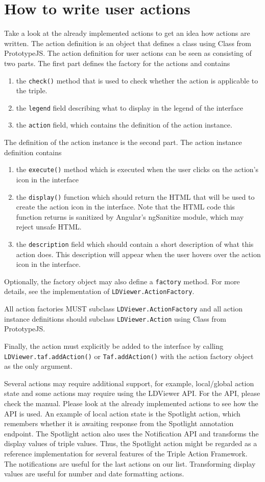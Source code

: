 \documentclass{article}
\begin{document}
\section{How to write user actions}
Take a look at the already implemented actions to get an idea how actions are written.
The action definition is an object that defines a class using Class from PrototypeJS.
The action definition for user actions can be seen as consisting of two parts. The first part defines the factory for the actions and contains 
\begin{enumerate}
\item the \texttt{check()} method that is used to check whether the action is applicable to the triple.
\item the \texttt{legend} field describing what to display in the legend of the interface
\item the \texttt{action} field, which contains the definition of the action instance.
\end{enumerate}
The definition of the action instance is the second part.
The action instance definition contains 
\begin{enumerate}
\item the \texttt{execute()} method which is executed when the user clicks on the action's icon in the interface
\item the \texttt{display()} function which should return the HTML that will be used to create the action icon in the interface. Note that the HTML code this function returns is sanitized by Angular's ngSanitize module, which may reject unsafe HTML.
\item the \texttt{description} field which should contain a short description of what this action does. This description will appear when the user hovers over the action icon in the interface.
\end{enumerate}
Optionally, the factory object may also define a \texttt{factory} method.
For more details, see the implementation of \texttt{LDViewer.ActionFactory}.

All action factories MUST subclass \texttt{LDViewer.ActionFactory} and all action instance definitions should subclass \texttt{LDViewer.Action} using Class from PrototypeJS.

Finally, the action must explicitly be added to the interface by calling \texttt{LDViewer.taf.addAction()} or \texttt{Taf.addAction()} with the action factory object as the only argument.

Several actions may require additional support, for example, local/global action state and some actions may require using the LDViewer API.
For the API, please check the manual.
Please look at the already implemented actions to see how the API is used.
An example of local action state is the Spotlight action, which remembers whether it is awaiting response from the Spotlight annotation endpoint.
The Spotlight action also uses the Notification API and transforms the display values of triple values.
Thus, the Spotlight action might be regarded as a reference implementation for several features of the Triple Action Framework.
The notifications are useful for the last actions on our list.
Transforming display values are useful for number and date formatting actions.
\end{document}
